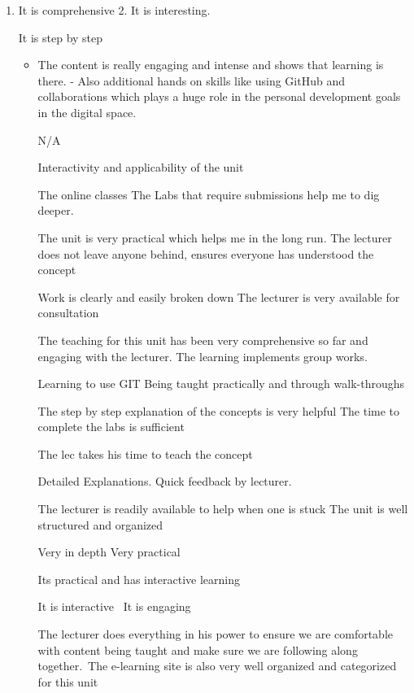 \documentclass[
]{article}
\providecommand{\tightlist}{%
  \setlength{\itemsep}{0pt}\setlength{\parskip}{0pt}}
\begin{document}
\begin{enumerate}
\def\labelenumi{\arabic{enumi}.}
\tightlist
\item
  It is comprehensive 2. It is interesting.

  It is step by step ~

  \begin{itemize}
  \tightlist
  \item
    The content is really engaging and intense and shows that learning
    is there. - Also additional hands on skills like using GitHub and
    collaborations which plays a huge role in the personal development
    goals in the digital space.~

    N/A

    Interactivity and applicability of the unit

    The online classes The Labs that require submissions help me to dig
    deeper.

    The unit is very practical which helps me in the long run. The
    lecturer does not leave anyone behind, ensures everyone has
    understood the concept

    Work is clearly and easily broken down The lecturer is very
    available for consultation

    The teaching for this unit has been very comprehensive so far and
    engaging with the lecturer. The learning implements group works.

    Learning to use GIT Being taught practically and through
    walk-throughs

    The step by step explanation of the concepts is very helpful The
    time to complete the labs is sufficient~

    The lec takes his time to teach the concept

    Detailed Explanations. Quick feedback by lecturer.

    The lecturer is readily available to help when one is stuck The unit
    is well structured and organized

    Very in depth Very practical

    Its practical and has interactive learning~

    It is interactive~ It is engaging

    The lecturer does everything in his power to ensure we are
    comfortable with content being taught and make sure we are following
    along together.~The e-learning site is also very well organized and
    categorized for this unit


\end{itemize}
\end{enumerate}
\end{document}
